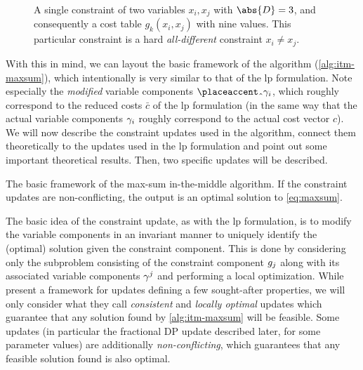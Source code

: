 \begin{figure}[tp]
	\centering
	
	\caption{A single constraint of two variables \(x_i,x_j\) with \(\abs{D}=3\), and consequently a cost table \(g_k(x_i,x_j)\) with nine values. This particular constraint is a hard \emph{all-different} constraint \(x_i\neq x_j\).}
	\label{fig:maxsum-components}
\end{figure}

With this in mind, we can layout the basic framework of the algorithm (\cref{alg:itm-maxsum}), which intentionally is very similar to that of the \gls{lp} formulation.
Note especially the \emph{modified} variable components \(\hat{\vcomp}_i\), which roughly correspond to the reduced costs \(\bar{c}\) of the \gls{lp} formulation (in the same way that the actual variable components \(\gamma_i\) roughly correspond to the actual cost vector \(c\)).
We will now describe the constraint updates used in the algorithm, connect them theoretically to the updates used in the \gls{lp} formulation and point out some important theoretical results.
Then, two specific updates will be described.

\begin{algorithm}[tbp]

	\caption{
		The basic framework of the max-sum in-the-middle algorithm.
		If the constraint updates are non-conflicting, the output is an optimal solution to \cref{eq:maxsum}.
	}
	\label{alg:itm-maxsum}
\end{algorithm}

The basic idea of the constraint update, as with the \gls{lp} formulation, is to modify the variable components in an invariant manner to uniquely identify the (optimal) solution given the constraint component.
This is done by considering only the subproblem consisting of the constraint component \(g_j\) along with its associated variable components \(\gamma^j\) and performing a local optimization.
While \textcite[\pno~100\psq]{Wedelin08} present a framework for updates defining a few sought-after properties, we will only consider what they call \emph{consistent} and \emph{locally optimal} updates which guarantee that any solution found by \cref{alg:itm-maxsum} will be feasible.
Some updates (in particular the fractional DP update described later, for some parameter values) are additionally \emph{non-conflicting}, which guarantees that any feasible solution found is also optimal.

